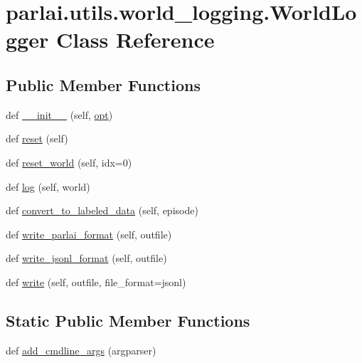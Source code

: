 \hypertarget{classparlai_1_1utils_1_1world__logging_1_1WorldLogger}{}\section{parlai.\+utils.\+world\+\_\+logging.\+World\+Logger Class Reference}
\label{classparlai_1_1utils_1_1world__logging_1_1WorldLogger}
\subsection*{Public Member Functions}
\begin{DoxyCompactItemize}
\item 
def \hyperlink{classparlai_1_1utils_1_1world__logging_1_1WorldLogger_aecf78591417c85526b5f3efb75bbdca1}{\+\_\+\+\_\+init\+\_\+\+\_\+} (self, \hyperlink{classparlai_1_1utils_1_1world__logging_1_1WorldLogger_aaf2ae02c76953a68916b5136c1d2cc31}{opt})
\item 
def \hyperlink{classparlai_1_1utils_1_1world__logging_1_1WorldLogger_ae53d57ea1f9df92d06b7d63bd8235bd5}{reset} (self)
\item 
def \hyperlink{classparlai_1_1utils_1_1world__logging_1_1WorldLogger_a1f3d6928454f5d230891388bb661681a}{reset\+\_\+world} (self, idx=0)
\item 
def \hyperlink{classparlai_1_1utils_1_1world__logging_1_1WorldLogger_a98460ce773e615dabd51e1f3ffb45db3}{log} (self, world)
\item 
def \hyperlink{classparlai_1_1utils_1_1world__logging_1_1WorldLogger_aef9b66c44083ace9c8c35a0b41828c34}{convert\+\_\+to\+\_\+labeled\+\_\+data} (self, episode)
\item 
def \hyperlink{classparlai_1_1utils_1_1world__logging_1_1WorldLogger_a9a5210ac32adcaec88d4b33265cbba92}{write\+\_\+parlai\+\_\+format} (self, outfile)
\item 
def \hyperlink{classparlai_1_1utils_1_1world__logging_1_1WorldLogger_a89f41f54a257d6f2c5fbae6a710d8b44}{write\+\_\+jsonl\+\_\+format} (self, outfile)
\item 
def \hyperlink{classparlai_1_1utils_1_1world__logging_1_1WorldLogger_a313438d1ccd5eef2b291dd0ee6dea59f}{write} (self, outfile, file\+\_\+format=\textquotesingle{}jsonl\textquotesingle{})
\end{DoxyCompactItemize}
\subsection*{Static Public Member Functions}
\begin{DoxyCompactItemize}
\item 
def \hyperlink{classparlai_1_1utils_1_1world__logging_1_1WorldLogger_a5e5cf4e2cabbf48f39e5e09b7578283a}{add\+\_\+cmdline\+\_\+args} (argparser)
\end{DoxyCompactItemize}
